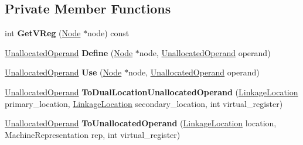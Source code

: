 \subsection*{Private Member Functions}
\begin{DoxyCompactItemize}
\item 
int {\bfseries Get\+V\+Reg} (\hyperlink{classv8_1_1internal_1_1compiler_1_1_node}{Node} $\ast$node) const \hypertarget{classv8_1_1internal_1_1compiler_1_1_operand_generator_ae1109b3ab735cb3bef838cb6b1eeeb1d}{}\label{classv8_1_1internal_1_1compiler_1_1_operand_generator_ae1109b3ab735cb3bef838cb6b1eeeb1d}

\item 
\hyperlink{classv8_1_1internal_1_1compiler_1_1_unallocated_operand}{Unallocated\+Operand} {\bfseries Define} (\hyperlink{classv8_1_1internal_1_1compiler_1_1_node}{Node} $\ast$node, \hyperlink{classv8_1_1internal_1_1compiler_1_1_unallocated_operand}{Unallocated\+Operand} operand)\hypertarget{classv8_1_1internal_1_1compiler_1_1_operand_generator_a6b66eeafe8aea57236b88bd6110ac759}{}\label{classv8_1_1internal_1_1compiler_1_1_operand_generator_a6b66eeafe8aea57236b88bd6110ac759}

\item 
\hyperlink{classv8_1_1internal_1_1compiler_1_1_unallocated_operand}{Unallocated\+Operand} {\bfseries Use} (\hyperlink{classv8_1_1internal_1_1compiler_1_1_node}{Node} $\ast$node, \hyperlink{classv8_1_1internal_1_1compiler_1_1_unallocated_operand}{Unallocated\+Operand} operand)\hypertarget{classv8_1_1internal_1_1compiler_1_1_operand_generator_a8272c2e46fdc5736334ceb7dd84af237}{}\label{classv8_1_1internal_1_1compiler_1_1_operand_generator_a8272c2e46fdc5736334ceb7dd84af237}

\item 
\hyperlink{classv8_1_1internal_1_1compiler_1_1_unallocated_operand}{Unallocated\+Operand} {\bfseries To\+Dual\+Location\+Unallocated\+Operand} (\hyperlink{classv8_1_1internal_1_1compiler_1_1_linkage_location}{Linkage\+Location} primary\+\_\+location, \hyperlink{classv8_1_1internal_1_1compiler_1_1_linkage_location}{Linkage\+Location} secondary\+\_\+location, int virtual\+\_\+register)\hypertarget{classv8_1_1internal_1_1compiler_1_1_operand_generator_a8d9870ef749fc990d3df1a9d5479cf29}{}\label{classv8_1_1internal_1_1compiler_1_1_operand_generator_a8d9870ef749fc990d3df1a9d5479cf29}

\item 
\hyperlink{classv8_1_1internal_1_1compiler_1_1_unallocated_operand}{Unallocated\+Operand} {\bfseries To\+Unallocated\+Operand} (\hyperlink{classv8_1_1internal_1_1compiler_1_1_linkage_location}{Linkage\+Location} location, Machine\+Representation rep, int virtual\+\_\+register)\hypertarget{classv8_1_1internal_1_1compiler_1_1_operand_generator_a04e44e525e1e077a88c0b1bae30210a6}{}\label{classv8_1_1internal_1_1compiler_1_1_operand_generator_a04e44e525e1e077a88c0b1bae30210a6}

\end{DoxyCompactItemize}
